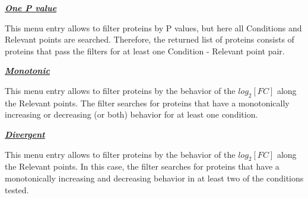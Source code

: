 \textbf{\textit{\underline{One P value}}}

This menu entry allows to filter proteins by P values, but here all Conditions and Relevant points are searched. Therefore, the returned list of proteins consists of proteins that pass the filters for at least one Condition - Relevant point pair.

\textbf{\textit{\underline{Monotonic}}}

This menu entry allows to filter proteins by the behavior of the $log_2[FC]$ along the Relevant points. The filter searches for proteins that have a monotonically increasing or decreasing (or both) behavior for at least one condition. 

\textbf{\textit{\underline{Divergent}}}

This menu entry allows to filter proteins by the behavior of the $log_2[FC]$ along the Relevant points. In this case, the filter searches for proteins that have a monotonically increasing and decreasing behavior in at least two of the conditions tested.





































